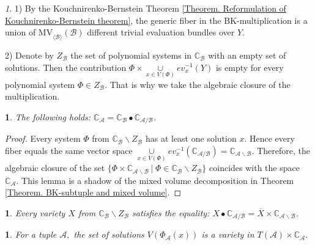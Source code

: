 \documentclass[11pt]{article}
\theoremstyle{plain}
\theoremstyle{definition}
\theoremstyle{remark}
\newtheorem{rem}[thm]{\protect\remarkname}
\theoremstyle{plain}
\newtheorem{lem}[thm]{\protect\lemmaname}
\theoremstyle{plain}
\theoremstyle{plain}
\newtheorem{cor}[thm]{\protect\corollaryname}
\theoremstyle{definition}
\providecommand{\corollaryname}{Corollary}
\providecommand{\lemmaname}{Lemma}
\providecommand{\remarkname}{Remark}
\begin{document}
\begin{rem}
1) By the Kouchnirenko-Bernstein Theorem \ref{Theorem. Reformulation of Kouchnirenko-Bernstein theorem},
the generic fiber in the BK-multiplication is a union of $\mathrm{MV}_{\overline{\langle\mathscr{B}\rangle}}(\mathscr{B})$
different trivial evaluation bundles over $Y$.

2) Denote by $Z_{\mathscr{B}}$ the set of polynomial systems in $\mathbb{C}_{\mathscr{B}}$
with an empty set of solutions. Then the contribution $\Phi\times\underset{x\in V(\Phi)}{\cup}ev_{x}^{-1}(Y)$
is empty for every polynomial system $\Phi\in Z_{\mathscr{B}}$. That
is why we take the algebraic closure of the multiplication.
\end{rem}

\begin{lem}
\label{Lemma. BK-multiplication for C}The following holds: $\mathbb{C}_{\mathscr{A}}=\mathbb{C}_{\mathscr{B}}\bullet\mathbb{C}_{\mathscr{A}/\mathscr{B}}$.
\end{lem}

\begin{proof}
Every system $\Phi$ from $\mathbb{C}_{\mathscr{B}}\backslash Z_{\mathscr{B}}$
has at least one solution $x$. Hence every fiber equals the same
vector space $\underset{x\in V(\Phi)}{\cup}ev_{x}^{-1}(\mathbb{C}_{\mathscr{A}/\mathscr{B}})=\mathbb{C}_{\mathscr{A}\backslash\mathscr{B}}$.
Therefore, the algebraic closure of the set $\{\Phi\times\mathbb{C}_{\mathscr{A}\backslash\mathscr{B}}\,|\;\Phi\in\mathbb{C}_{\mathscr{B}}\backslash Z_{\mathscr{B}}\}$
coincides with the space $\mathbb{C}_{\mathscr{A}}.$ This lemma is
a shadow of the mixed volume decomposition in Theorem \ref{Theorem. BK-subtuple and mixed volume}.
\end{proof}
\begin{cor}
\label{Corollay. BK-multiplicaiton for XoC}Every variety $X$ from
$\mathbb{C}_{\mathscr{B}}\backslash Z_{\mathscr{B}}$ satisfies the
equality: $X\bullet\mathbb{C}_{\mathscr{A}/\mathscr{B}}=\overline{X}\times\mathbb{C}_{\mathscr{A}\backslash\mathscr{B}}$.
\end{cor}

\begin{lem}
\label{Lemma. The set of solutions is a variety}For a tuple $\mathscr{A},$
the set of solutions $V(\Phi_{\mathscr{A}}(x))$ is a variety in $T(\mathscr{A})\times\mathbb{C}_{\mathscr{A}}.$
\end{lem}
\end{document}
